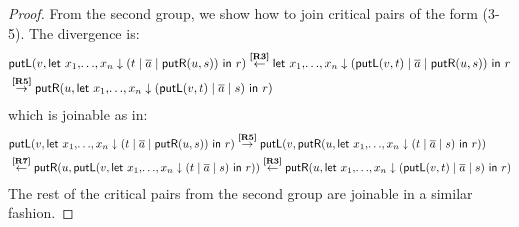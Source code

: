 \documentclass[twoside,11pt,final]{entics}
\newcommand{\putr}{\mathsf{putR}}
\newcommand{\putl}{\mathsf{putL}}
\newcommand{\from}{\leftarrow}
\newcommand{\asn}{\downarrow}
\newcommand{\seq}{,\!\ldots\!,}
\begin{document}
\begin{proof}
From the second group, we show how to join critical pairs of the form (3-5). The divergence is:
\begin{align*}
  & \putl(v,\textsf{let } x_1 \seq x_n \asn (t \mid \overline{a} \mid \putr(u,s)) \textsf{ in } r)
  \overset{\text{\bf[R3]}}{\from} \textsf{let } x_1 \seq x_n \asn (\putl(v,t) \mid \overline{a} \mid \putr(u,s)) \textsf{ in } r
  \\& \overset{\text{\bf[R5]}}{\to} \putr(u,\textsf{let } x_1 \seq x_n \asn (\putl(v,t) \mid \overline{a} \mid s) \textsf{ in } r)
\end{align*}
which is joinable as in:
\begin{align*}
  & \putl(v,\textsf{let } x_1 \seq x_n \asn (t \mid \overline{a} \mid \putr(u,s)) \textsf{ in } r)
    \overset{\text{\bf[R5]}}{\to} \putl(v,\putr(u,\textsf{let } x_1 \seq x_n \asn (t \mid \overline{a} \mid s) \textsf{ in } r))
  \\& \overset{\text{\bf[R7]}}{\from} \putr(u,\putl(v,\textsf{let } x_1 \seq x_n \asn (t \mid \overline{a} \mid s) \textsf{ in } r))
  \overset{\text{\bf[R3]}}{\from} \putr(u,\textsf{let } x_1 \seq x_n \asn (\putl(v,t) \mid \overline{a} \mid s) \textsf{ in } r)
\end{align*}
The rest of the critical pairs from the second group are joinable in a similar fashion. 


\end{proof}
\end{document}
